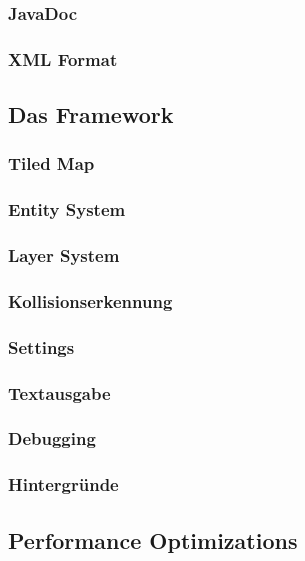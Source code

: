 		\subsubsection{JavaDoc}						             %
		\subsubsection{XML Format}					                 %
	\subsection{Das Framework}
		\subsubsection{Tiled Map}					
		\subsubsection{Entity System}				        %
		\subsubsection{Layer System}				         %
		\subsubsection{Kollisionserkennung}			
		\subsubsection{Settings}					
		\subsubsection{Textausgabe}					          %
		\subsubsection{Debugging}					           %
		\subsubsection{Hintergründe}				         %
	\subsection{Performance Optimizations}			         %
